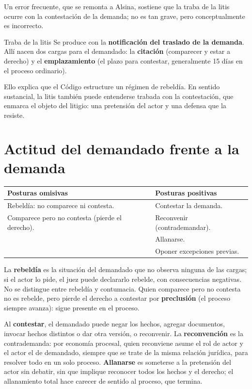 \documentclass[12pt,oneside]{book}
\renewcommand{\arraystretch}{1.15}
\begin{document}
Un error frecuente, que se remonta a Alsina, sostiene que la traba de la litis ocurre con la contestación de la demanda; no es tan grave, pero conceptualmente es incorrecto.

\begin{definicion}{Traba de la litis}
Se produce con la \textbf{notificación del traslado de la demanda}. Allí nacen dos cargas para el demandado: la \textbf{citación} (comparecer y estar a derecho) y el \textbf{emplazamiento} (el plazo para contestar, generalmente 15 días en el proceso ordinario).
\end{definicion}

Ello explica que el Código estructure un régimen de rebeldía. En sentido sustancial, la litis también puede entenderse trabada con la contestación, que enmarca el objeto del litigio: una pretensión del actor y una defensa que la resiste.

\section{Actitud del demandado frente a la demanda}

\begin{table}[H]
\centering
\renewcommand{\arraystretch}{1.25}
\begin{tabularx}{\textwidth}{>{\RaggedRight\arraybackslash}X>{\RaggedRight\arraybackslash}X}
\toprule
\textbf{Posturas omisivas} & \textbf{Posturas positivas} \\
\midrule
Rebeldía: no comparece ni contesta. & Contestar la demanda. \\
Comparece pero no contesta (pierde el derecho). & Reconvenir (contrademandar). \\
 & Allanarse. \\
 & Oponer excepciones previas. \\
\bottomrule
\end{tabularx}
\end{table}

La \textbf{rebeldía} es la situación del demandado que no observa ninguna de las cargas; si el actor lo pide, el juez puede declararlo rebelde, con consecuencias negativas. No se distingue entre rebeldía y contumacia. Quien comparece pero no contesta no es rebelde, pero pierde el derecho a contestar por \textbf{preclusión} (el proceso siempre avanza): sigue presente en el proceso.

Al \textbf{contestar}, el demandado puede negar los hechos, agregar documentos, invocar hechos distintos o dar otra versión, o reconvenir. La \textbf{reconvención} es la contrademanda: por economía procesal, quien reconviene asume el rol de actor y el actor el de demandado, siempre que se trate de la misma relación jurídica, para resolver todo en un solo proceso. \textbf{Allanarse} es someterse a la pretensión del actor sin debatir, sin que implique reconocer todos los hechos y el derecho; el allanamiento total hace carecer de sentido al proceso, que termina.
\end{document}
